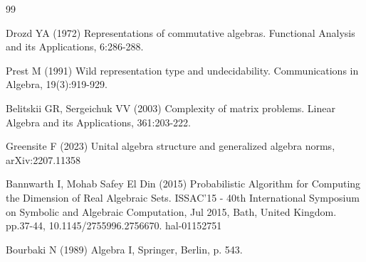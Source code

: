 \documentclass{amsart}
\numberwithin{equation}{section}
\theoremstyle{definition}
\numberwithin{theorem}{section}
\begin{document}
   \begin{thebibliography}{99}
   
     Drozd YA (1972) Representations of commutative algebras. Functional Analysis and its Applications, 6:286-288.
   
        Prest M (1991) Wild representation type and undecidability.  Communications in Algebra, 19(3):919-929.
       
        Belitskii GR, Sergeichuk VV (2003) Complexity of matrix problems.  Linear Algebra and its Applications, 361:203-222.
       
         Greensite F (2023) Unital algebra structure and generalized algebra norms, arXiv:2207.11358
               
     Bannwarth I, Mohab Safey El Din (2015) Probabilistic Algorithm for Computing the Dimension of Real Algebraic Sets. ISSAC’15 - 40th International Symposium on Symbolic and Algebraic Computation, Jul 2015, Bath, United Kingdom. pp.37-44, 10.1145/2755996.2756670. hal-01152751
 
   Bourbaki N (1989) Algebra I, Springer, Berlin, p. 543.

       
      \end{thebibliography}
   
   
\end{document}
